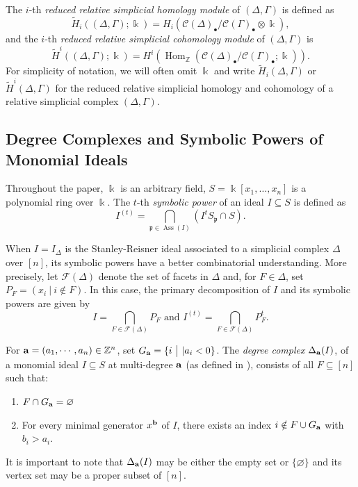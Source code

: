 \documentclass[12pt]{amsart}
\numberwithin{equation}{section}
\theoremstyle{definition}
\theoremstyle{definition}
\DeclareMathOperator{\Ass}{Ass}
\newcommand{\ZZ}{{\mathbb Z}}
\def\kk{{\Bbbk}}
\def\pp{{\mathfrak p}}
\def\a{{\bold a}}
\def\b{{\bold b}}
\def\F{\mathcal{F}}
\begin{document}
	The $i$-th \textit{reduced relative simplicial homology module} of $(\Delta, \Gamma)$ is defined as $$\widetilde{H}_{i}((\Delta,\Gamma);\kk)=H_{i}(\mathcal{C}(\Delta)_{\bullet}/\mathcal{C}(\Gamma)_{\bullet}\otimes \kk),$$ and the $i$-th \textit{reduced relative simplicial cohomology module} of $(\Delta, \Gamma)$ is $$\widetilde{H}^{i}((\Delta,\Gamma);\kk)=H^{i}(\operatorname{Hom}_{\mathbb{Z}}(\mathcal{C}(\Delta)_{\bullet}/\mathcal{C}(\Gamma)_{\bullet};\kk)).$$
	For simplicity of notation, we will often omit $\kk$ and write $\widetilde{H}_{i}(\Delta,\Gamma)$ or $\widetilde{H}^{i}(\Delta,\Gamma)$ for the reduced relative simplicial homology and cohomology of a relative simplicial complex $(\Delta,\Gamma)$.
	
	\subsection{Degree Complexes and Symbolic Powers of Monomial Ideals}
	
	Throughout the paper, $\kk$ is an arbitrary field, $S = \kk[x_1, \dots, x_n]$ is a polynomial ring over $\kk$. 	
	The $t$-th \emph{symbolic power} of an ideal $I \subseteq S$ is defined as
	$$I^{(t)} = \bigcap_{\pp \in \Ass(I)} \left(I^tS_\pp \cap S\right).$$
	
	When $I = I_\Delta$ is the Stanley-Reisner ideal associated to a simplicial complex $\Delta$ over $[n]$, its symbolic powers have a better combinatorial understanding. More precisely, let $\F(\Delta)$ denote the set of facets in $\Delta$ and, for $F \in \Delta$, set $P_F = (x_i ~\big|~ i \not\in F).$ In this case, the primary decomposition of $I$ and its symbolic powers are given by
	$$I = \bigcap_{F \in \F(\Delta)} P_F \text{ and } I^{(t)} = \bigcap_{F \in \F(\Delta)} P_F^t.$$
	
	For $\a = (a_1, \cdots, a_n) \in \ZZ^n$, set $G_{\a}=\{i ~\big|~ |a_{i}<0\}$. The \textit{degree complex} $\Delta_{\a}(I)$, of a monomial ideal $I \subseteq S$ at multi-degree $\a$ (as defined in \cite{T2005}), consists of all $F\subseteq[n]$ such that:
	\begin{enumerate}
		\item $F\cap G_{\a}=\varnothing$
		\item For every minimal generator $x^{\b}$ of $I$, there exists an index $i\notin F\cup G_{\a}$ with $b_{i}>a_{i}$.
	\end{enumerate}
	It is important to note that $\Delta_{\a}(I)$ may be either the empty set or $\{\varnothing\}$ and its vertex set may be a proper subset of $[n]$.
	
\end{document}
